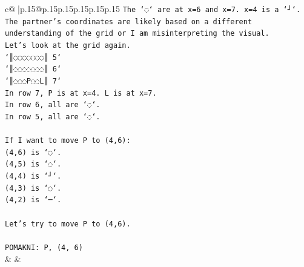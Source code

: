 \documentclass{article}
\begin{document}
{\begin{supertabular}{c@{$\;$}|p{.15\linewidth}@{}p{.15\linewidth}p{.15\linewidth}p{.15\linewidth}p{.15\linewidth}p{.15\linewidth}}
{{{\texttt{The `◌` are at x=6 and x=7. x=4 is a `┘`.} \\
\texttt{The partner's coordinates are likely based on a different understanding of the grid or I am misinterpreting the visual.} \\
\texttt{Let's look at the grid again.} \\
\texttt{`║◌◌◌◌◌◌◌║ 5`} \\
\texttt{`║◌◌◌◌◌◌◌║ 6`} \\
\texttt{`║◌◌◌P◌◌L║ 7`} \\
\texttt{In row 7, P is at x=4. L is at x=7.} \\
\texttt{In row 6, all are `◌`.} \\
\texttt{In row 5, all are `◌`.} \\
\\ 
\texttt{If I want to move P to (4,6):} \\
\texttt{(4,6) is `◌`.} \\
\texttt{(4,5) is `◌`.} \\
\texttt{(4,4) is `┘`.} \\
\texttt{(4,3) is `◌`.} \\
\texttt{(4,2) is `─`.} \\
\\ 
\texttt{Let's try to move P to (4,6).} \\
\\ 
\texttt{POMAKNI: P, (4, 6)} \\
            }
        }
    }
    & & \\ \\


\end{supertabular}}
\end{document}
